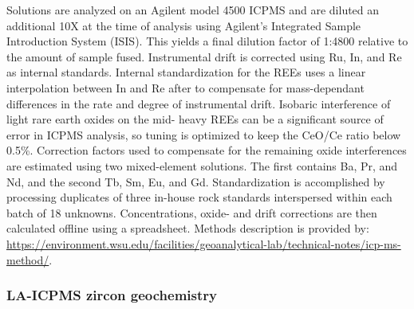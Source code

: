 \documentclass[11pt,letterpaper]{article}
\begin{document}
Solutions are analyzed on an Agilent model 4500 ICPMS and are diluted an additional 10X at the time of analysis using Agilent’s Integrated Sample Introduction System (ISIS). This yields a final dilution factor of 1:4800 relative to the amount of sample fused. Instrumental drift is corrected using Ru, In, and Re as internal standards. Internal standardization for the REEs uses a linear interpolation between In and Re after \cite{Doherty1989a} to compensate for mass-dependant differences in the rate and degree of instrumental drift. Isobaric interference of light rare earth oxides on the mid- heavy REEs can be a significant source of error in ICPMS analysis, so tuning is optimized to keep the CeO/Ce ratio below 0.5\%. Correction factors used to compensate for the remaining oxide interferences are estimated using two mixed-element solutions. The first contains Ba, Pr, and Nd, and the second Tb, Sm, Eu, and Gd.  Standardization is accomplished by processing duplicates of three in-house rock standards interspersed within each batch of 18 unknowns. Concentrations, oxide- and drift corrections are then calculated offline using a spreadsheet. Methods description is provided by: \url{https://environment.wsu.edu/facilities/geoanalytical-lab/technical-notes/icp-ms-method/}.  


\subsubsection*{LA-ICPMS zircon geochemistry}

\end{document}
